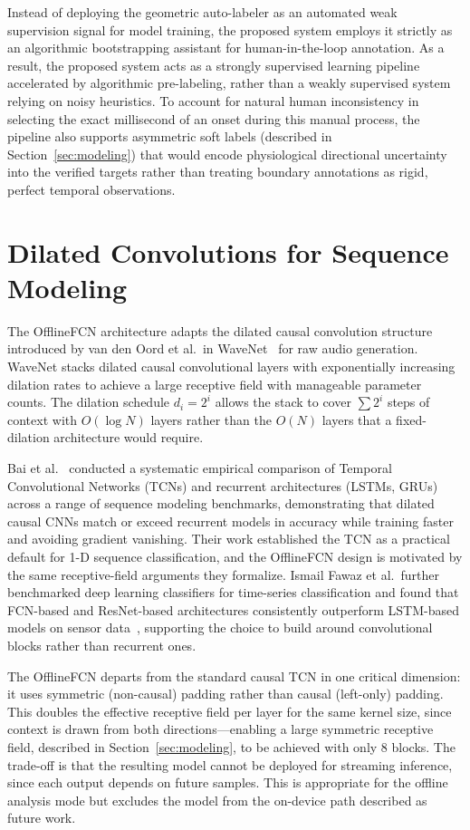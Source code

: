Instead of deploying the geometric auto-labeler as an automated weak supervision signal for model training, the proposed system employs it strictly as an algorithmic bootstrapping assistant for human-in-the-loop annotation. As a result, the proposed system acts as a strongly supervised learning pipeline accelerated by algorithmic pre-labeling, rather than a weakly supervised system relying on noisy heuristics. To account for natural human inconsistency in selecting the exact millisecond of an onset during this manual process, the pipeline also supports asymmetric soft labels (described in Section~\ref{sec:modeling}) that would encode physiological directional uncertainty into the verified targets rather than treating boundary annotations as rigid, perfect temporal observations.

\section{Dilated Convolutions for Sequence Modeling}

The OfflineFCN architecture adapts the dilated causal convolution structure introduced by van den Oord et al.\ in WaveNet~\cite{van_den_oord_wavenet_2016} for raw audio generation. WaveNet stacks dilated causal convolutional layers with exponentially increasing dilation rates to achieve a large receptive field with manageable parameter counts. The dilation schedule $d_i = 2^i$ allows the stack to cover $\sum 2^i$ steps of context with $O(\log N)$ layers rather than the $O(N)$ layers that a fixed-dilation architecture would require.

Bai et al.~\cite{bai2018tcn} conducted a systematic empirical comparison of Temporal Convolutional Networks (TCNs) and recurrent architectures (LSTMs, GRUs) across a range of sequence modeling benchmarks, demonstrating that dilated causal CNNs match or exceed recurrent models in accuracy while training faster and avoiding gradient vanishing. Their work established the TCN as a practical default for 1-D sequence classification, and the OfflineFCN design is motivated by the same receptive-field arguments they formalize. Ismail Fawaz et al.\ further benchmarked deep learning classifiers for time-series classification and found that FCN-based and ResNet-based architectures consistently outperform LSTM-based models on sensor data~\cite{ismail_fawaz_ts_2019}, supporting the choice to build around convolutional blocks rather than recurrent ones.

The OfflineFCN departs from the standard causal TCN in one critical dimension: it uses symmetric (non-causal) padding rather than causal (left-only) padding. This doubles the effective receptive field per layer for the same kernel size, since context is drawn from both directions---enabling a large symmetric receptive field, described in Section~\ref{sec:modeling}, to be achieved with only 8 blocks. The trade-off is that the resulting model cannot be deployed for streaming inference, since each output depends on future samples. This is appropriate for the offline analysis mode but excludes the model from the on-device path described as future work.


